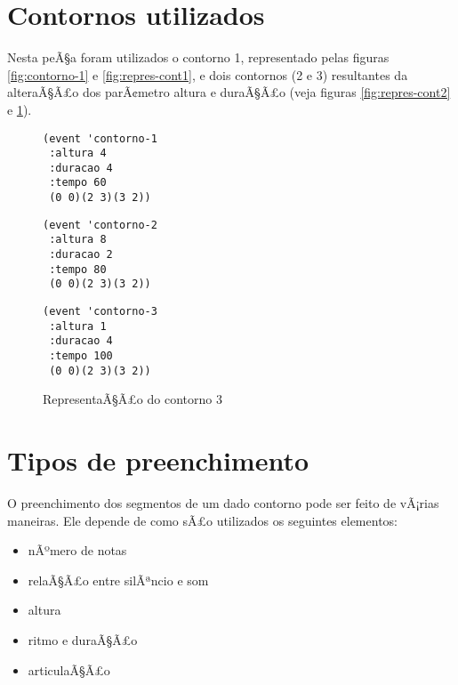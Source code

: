 \documentclass[12pt]{article}
\begin{document}
\section{Contornos utilizados}
\label{sec:contorno-utilizado}

Nesta peÃ§a foram utilizados o contorno 1, representado pelas figuras
\ref{fig:contorno-1} e \ref{fig:repres-cont1}, e dois contornos (2 e
3) resultantes da alteraÃ§Ã£o dos parÃ¢metro altura e duraÃ§Ã£o (veja
figuras \ref{fig:repres-cont2} e \ref{fig:repres-cont3}).

\begin{figure}
\begin{minipage}{5cm}
  \centering
\begin{verbatim}
(event 'contorno-1
 :altura 4
 :duracao 4
 :tempo 60
 (0 0)(2 3)(3 2))
\end{verbatim}
  \caption{RepresentaÃ§Ã£o do contorno 1}
  \label{fig:repres-cont1}
\end{minipage}
\hfill
\begin{minipage}{5cm}
  \centering
\begin{verbatim}
(event 'contorno-2
 :altura 8
 :duracao 2
 :tempo 80
 (0 0)(2 3)(3 2))
\end{verbatim}
  \caption{RepresentaÃ§Ã£o do contorno 2}
  \label{fig:repres-cont2}
\end{minipage}
\hfill
\begin{minipage}{5cm}
  \centering
\begin{verbatim}
(event 'contorno-3
 :altura 1
 :duracao 4
 :tempo 100
 (0 0)(2 3)(3 2))
\end{verbatim}
  \caption{RepresentaÃ§Ã£o do contorno 3}
  \label{fig:repres-cont3}
\end{minipage}
\hfill
\end{figure}

\section{Tipos de preenchimento}
\label{sec:tipos-de-preench}

O preenchimento dos segmentos de um dado contorno pode ser feito de
vÃ¡rias maneiras. Ele depende de como sÃ£o utilizados os seguintes
elementos:

\begin{itemize}
\item nÃºmero de notas
\item relaÃ§Ã£o entre silÃªncio e som
\item altura
\item ritmo e duraÃ§Ã£o
\item articulaÃ§Ã£o
\end{itemize}
\end{document}

